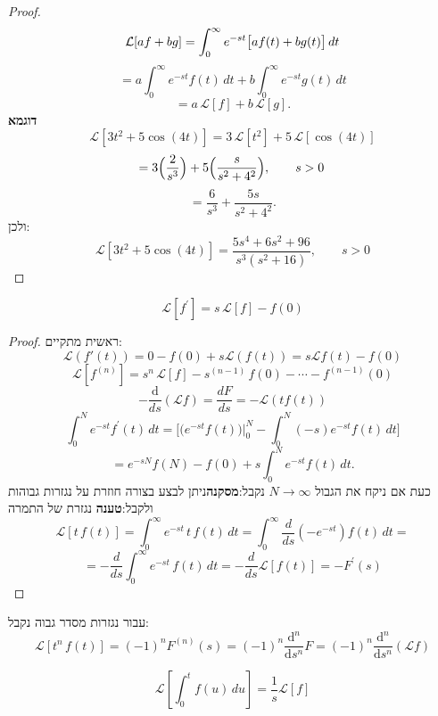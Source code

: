 \documentclass{tstextbook}
\begin{document}
\begin{proof}
$$\mathcal{L}[af+bg]=\int_{0}^{\infty}e^{-st}\big{[}af(t)+bg(t)\big{]}\,dt$$$$=a\int_{0}^{\infty}e^{-st}f(t)\,dt+b\int_{0}^{\infty}e^{-st}g(t)\,dt$$$$=a\,\mathcal{L}[f]+b\,\mathcal{L}[g].$$\textbf{דוגמא}$$\mathcal{L}[3t^{2}+5\cos(4t)]=3\,\mathcal{L}[t^{2}]+5\,\mathcal{L}[\cos(4t)]$$$$=3\Big{(}\frac{2}{s^{3}}\Big{)}+5\Big{(}\frac{s}{s^{2}+4^{2}}\Big{)},\qquad s>0\,$$$$=\frac{6}{s^{3}}+\frac{5s}{s^{2}+4^{2}}.$$
ולכן:
$${\mathcal{L}}[3t^{2}+5\cos(4t)]={\frac{5s^{4}+6s^{2}+96}{s^{3}(s^{2}+16)}},\qquad s>0$$

\end{proof}
\begin{proposition}
$${\mathcal{L}}[f^{\prime}]=s\,{\mathcal{L}}[f]-f(0)$$

\end{proposition}
\begin{proof}
ראשית מתקיים:
$$\mathcal{L}(f'(t))=0-f(0)+s\mathcal{L}(f(t))=s\mathcal{L}f(t)-f(0)$$$${\mathcal{L}}[f^{(n)}]=s^{n}\,{\mathcal{L}}[f]-s^{(n-1)}\,f(0)-\cdots-f^{(n-1)}(0)$$$$-\frac{\mathrm{d}}{ds}(\mathcal{L}f) = \frac{dF}{ds}=-\mathcal{L}(tf(t))$$$$\int_{0}^{N}e^{-s t}f^{\prime}(t)\,d t=\Big[\Big(e^{-s t}f(t)\Big)\Big|_{0}^{N}-\int_{0}^{N}(-s)e^{-s t}f(t)\,d t\Big]$$$$=e^{-s N}f(N)-f(0)+s\int_{0}^{N}e^{-s t}f(t)\,d t.$$כעת אם ניקח את הגבול \(N\to \infty\) נקבל:\textbf{מסקנה}ניתן לבצע בצורה חוזרת על נגזרות גבוהות ולקבל:\textbf{טענה} נגזרת של התמרה
$$\mathcal{L}[t\,f(t)]=\int_{0}^{\infty}e^{-st}\,t\,f(t)\,dt=\int_{0}^{\infty}\frac{d}{ds}\left(-e^{-st}\right)f(t)\,dt=$$$$=-\frac{d}{ds}\int_{0}^{\infty}e^{-st}\,f(t)\,dt=-\frac{d}{ds}\mathcal{L}[f(t)]=-F^{\prime}(s)$$

\end{proof}
\begin{corollary}
עבור נגזרות מסדר גבוה נקבל:
$${\mathcal{L}}\left[ t^{n}\,f(t) \right]=(-1)^{n}F^{(n)}(s)=(-1)^{n}\frac{\mathrm{d} ^{n}}{\mathrm{d} s ^{n}} F =(-1)^{n}\frac{\mathrm{d} ^{n}}{\mathrm{d} s ^{n}} \left( \mathcal{L}f \right) $$

\end{corollary}
\begin{proposition}
$${\mathcal{L}}\left[\int_{0}^{t}f(u)\,d u\right]={\frac{1}{s}}{\mathcal{L}}\left[f\right]$$

\end{proposition}
\end{document}
